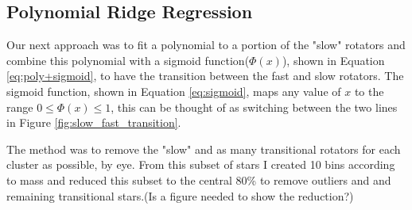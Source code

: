 \documentclass[fleqn,usenatbib]{mnras}
\begin{document}
\subsection{Polynomial Ridge Regression}
Our next approach was to fit a polynomial to a portion of the "slow" rotators and combine this polynomial with a sigmoid function($\Phi\left(x\right)$), shown in Equation \ref{eq:poly+sigmoid}, to have the transition between the fast and slow rotators.
The sigmoid function, shown in Equation \ref{eq:sigmoid}, maps any value of $x$ to the range $ 0 \leq \Phi\left(x\right) \leq 1$, this can be thought of as switching between the two lines in Figure \ref{fig:slow_fast_transition}.

The method was to remove the "slow" and as many transitional rotators for each cluster as possible, by eye.
From this subset of stars I created 10 bins according to mass and reduced this subset to the central 80\% to remove outliers and and remaining transitional stars.(Is a figure needed to show the reduction?)
\end{document}
